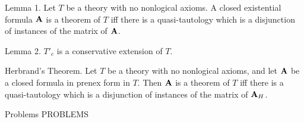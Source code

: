 
\proclaim Lemma 1. Let $T$ be a theory with no nonlogical axioms. A closed existential
formula ${\bf A}$ is a theorem of $T$ iff there is a quasi-tautology which is a disjunction
of instances of the matrix of ${\bf A}$.

\proclaim Lemma 2. $T'_c$ is a conservative extension of $T$.

\proclaim Herbrand's Theorem. Let $T$ be a theory with no nonlogical axioms, and let
${\bf A}$ be a closed formula in prenex form in $T$. Then ${\bf A}$ is a theorem of $T$ iff
there is a quasi-tautology which is a disjunction of instances of the matrix of ${\bf A}_H$.

 {Problems}
\beginsection PROBLEMS

\vfill
\break
